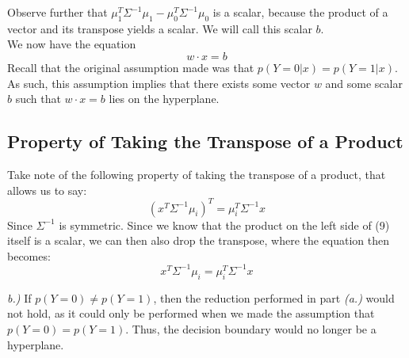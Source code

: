 \documentclass[11pt]{article}
\begin{document}
\noindent Observe further that $\mu^T_1\Sigma^{-1}\mu_1 - \mu^T_0\Sigma^{-1}\mu_0$ is a scalar, because the product of a vector and its transpose yields a scalar. We will call this scalar $b$.\\

\noindent We now have the equation
\begin{equation}
w \cdot x = b
\end{equation}
Recall that the original assumption made was that $p(Y=0|x) = p(Y=1|x)$. As such, this assumption implies that there exists some vector $w$ and some scalar $b$ such that $w \cdot x = b$ lies on the hyperplane.

\subsection*{Property of Taking the Transpose of a Product}
Take note of the following property of taking the transpose of a product, that allows us to say:
\begin{equation}
(x^T\Sigma^{-1}\mu_i)^T = \mu^T_i \Sigma^{-1}x
\end{equation}
Since $\Sigma^{-1}$ is symmetric. Since we know that the product on the left side of (9) itself is a scalar, we can then also drop the transpose, where the equation then becomes:
\begin{equation}
x^T\Sigma^{-1}\mu_i = \mu^T_i \Sigma^{-1}x
\end{equation}

\noindent \textit{b.)} If $p(Y = 0) \neq p(Y = 1)$, then the reduction performed in part \textit{(a.)} would not hold, as it could only be performed when we made the assumption that $p(Y = 0) = p(Y = 1)$. Thus, the decision boundary would no longer be a hyperplane.
\end{document}
